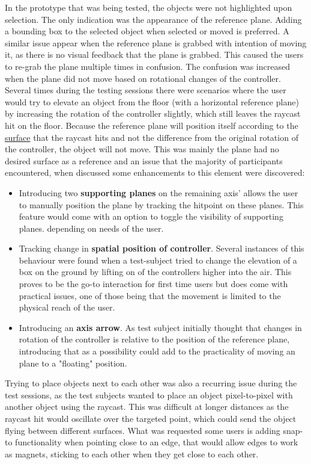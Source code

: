 In the prototype that was being tested, the objects were not highlighted upon selection. The only indication was the appearance of the reference plane. Adding a bounding box to the selected object when selected or moved is preferred. A similar issue appear when the reference plane is grabbed with intention of moving it, as there is no visual feedback that the plane is grabbed. This caused the users to re-grab the plane multiple times in confusion. The confusion was increased when the plane did not move based on rotational changes of the controller. Several times during the testing sessions there were scenarios where the user would try to elevate an object from the floor (with a horizontal reference plane) by increasing the rotation of the controller slightly, which still leaves the raycast hit on the floor. Because the reference plane will position itself according to the \underline{surface} that the raycast hits and not the difference from the original rotation of the controller, the object will not move. This was mainly the plane had no desired surface as a reference and an issue that the majority of participants encountered, when discussed some enhancements to this element were discovered:
\begin{itemize}
  \item Introducing two \textbf{supporting planes} on the remaining axis' allows the user to manually position the plane by tracking the hitpoint on these planes. This feature would come with an option to toggle the visibility of supporting planes. depending on needs of the user.
  \item Tracking change in \textbf{spatial position of controller}. Several instances of this behaviour were found when a test-subject tried to change the elevation of a box on the ground by lifting on of the controllers higher into the air. This proves to be the go-to interaction for first time users but does come with practical issues, one of those being that the movement is limited to the physical reach of the user.
  \item Introducing an \textbf{axis arrow}. As test subject initially thought that changes in rotation of the controller is relative to the position of the reference plane, introducing that as a possibility could add to the practicality of moving an plane to a "floating" position.
\end{itemize}
Trying to place objects next to each other was also a recurring issue during the test sessions, as the test subjects wanted to place an object pixel-to-pixel with another object using the raycast. This was difficult at longer distances as the raycast hit would oscillate over the targeted point, which could send the object flying between different surfaces. What was requested some users is adding snap-to functionality when pointing close to an edge, that would allow edges to work as magnets, sticking to each other when they get close to each other.

